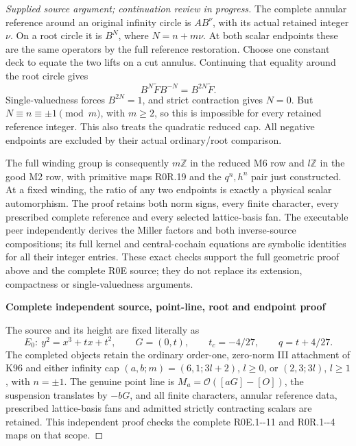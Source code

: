 \begin{proof}[Supplied source argument; continuation review in progress]
The complete annular reference around an original infinity circle
is \(AB^\nu\), with its actual retained integer \(\nu\). On a
root circle it is \(B^N\), where \(N=n+m\nu\). At both scalar
endpoints these are the same operators by the full reference
restoration. Choose one constant deck to equate the two lifts on
a cut annulus. Continuing that equality around the root circle gives
\[
 B^N\widetilde F B^{-N}=B^{2N}\widetilde F.
 \tag{R0R.20}
\]
Single-valuedness forces \(B^{2N}=1\), and strict contraction gives
\(N=0\). But \(N\equiv n\equiv\pm1\pmod m\), with \(m\ge2\),
so this is impossible for every retained reference integer. This
also treats the quadratic reduced cap. All negative endpoints are
excluded by their actual ordinary/root comparison.

The full winding group is consequently \(m\mathbb Z\) in the
reduced M6 row and \(l\mathbb Z\) in the good M2 row, with primitive
maps R0R.19 and the \(q^n,h^n\) pair just constructed. At a fixed
winding, the ratio of any two endpoints is exactly a physical scalar
automorphism. The proof retains both norm signs, every finite
character, every prescribed complete reference and every selected
lattice-basis fan. The executable peer independently derives the
Miller factors and both inverse-source compositions; its full kernel
and central-cochain equations are symbolic identities for all their
integer entries. These exact checks support the full geometric proof
above and the complete R0E source; they do not replace its extension,
compactness or single-valuedness arguments.


\par\bigskip\noindent\textbf{Complete independent source, point-line, root and endpoint proof}\par\nobreak

The source and its height are fixed literally as
\[
 E_0:\ y^2=x^3+tx+t^2,\qquad G=(0,t),\qquad
 t_c=-4/27,\qquad q=t+4/27.
 \tag{R0P.1}
\]
The completed objects retain the ordinary order-one, zero-norm III
attachment of K96 and either infinity cap
\((a,b;m)=(6,1;3l+2)\), \(l\ge0\), or
\((2,3;3l)\), \(l\ge1\), with \(n=\pm1\).
The genuine point line is \(M_a=\mathcal O([aG]-[O])\), the
suspension translates by \(-bG\), and all finite characters,
annular reference data, prescribed lattice-basis fans and admitted
strictly contracting scalars are retained. This independent proof
checks the complete R0E.1-\/-11 and R0R.1-\/-4 maps on that scope.


\end{proof}
